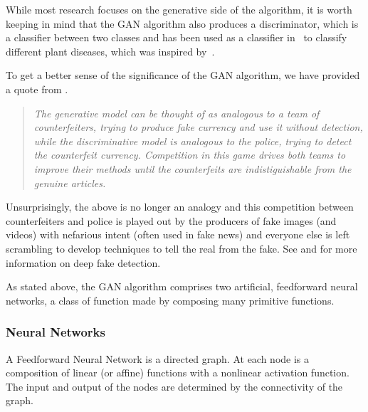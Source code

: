 While most research focuses on the generative side of the algorithm, it is worth
keeping in mind that the GAN algorithm also produces a discriminator, which is a
classifier between two classes and has been used as a classifier
in~\cite{ref:cortes-2017} to classify different plant diseases, which was
inspired by~\cite{ref:odena-2016}.

To get a better sense of the significance of the GAN algorithm, we have provided
a quote from \cite{ref:goodfellow-original}.

\begin{quote}
  \itshape
  The generative model can be thought of as analogous to a team of
  counterfeiters, trying to produce fake currency and use it without detection,
  while the discriminative model is analogous to the police, trying to detect
  the counterfeit currency. Competition in this game drives both teams to
  improve their methods until the counterfeits are indistiguishable from the
  genuine articles.
\end{quote}

Unsurprisingly, the above is no longer an analogy and this competition between
counterfeiters and police is played out by the producers of fake images (and
videos) with nefarious intent (often used in fake news) and everyone else is
left scrambling to develop techniques to tell the real from the fake. See
 \cite{ref:df11} and
\cite{ref:df12} for more information on deep fake detection.

As stated above, the GAN algorithm comprises two artificial, feedforward neural
networks, a class of function made by composing many primitive functions.

\subsubsection*{Neural Networks}

\begin{definition}
  A \textnormal{\sffamily Feedforward Neural Network} is a directed graph. At
  each node is a composition of linear (or affine) functions with a nonlinear
  activation function. The input and output of the nodes are determined by the
  connectivity of the graph.
\end{definition}

